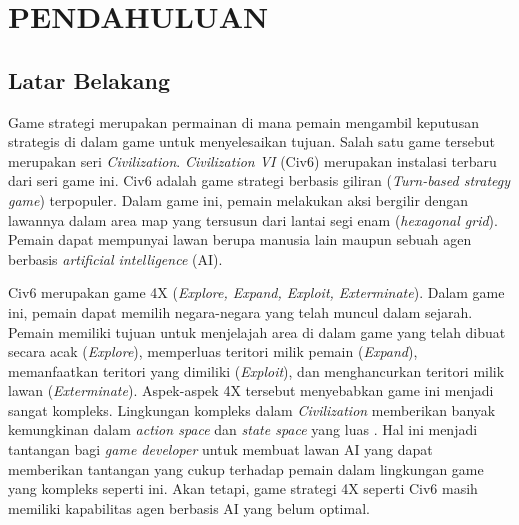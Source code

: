 \chapter{PENDAHULUAN}
\label{chap:pendahuluan}


\section{Latar Belakang}
\label{sec:latarbelakang}

Game strategi merupakan permainan di mana pemain mengambil keputusan strategis di dalam game untuk menyelesaikan tujuan. 
Salah satu game tersebut merupakan seri \emph{Civilization}. 
\emph{Civilization VI} (Civ6) merupakan instalasi terbaru dari seri game ini. 
Civ6 adalah game strategi berbasis giliran (\emph{Turn-based strategy game}) terpopuler. 
Dalam game ini, pemain melakukan aksi bergilir dengan lawannya dalam area map yang tersusun dari lantai segi enam (\emph{hexagonal grid}).
Pemain dapat mempunyai lawan berupa manusia lain maupun sebuah agen berbasis \emph{artificial intelligence} (AI).

Civ6 merupakan game 4X (\emph{Explore, Expand, Exploit, Exterminate}). 
Dalam game ini, pemain dapat memilih negara-negara yang telah muncul dalam sejarah. 
Pemain memiliki tujuan untuk menjelajah area di dalam game yang telah dibuat secara acak (\emph{Explore}), memperluas teritori milik pemain (\emph{Expand}), memanfaatkan teritori yang dimiliki (\emph{Exploit}), dan menghancurkan teritori milik lawan (\emph{Exterminate}). 
Aspek-aspek 4X tersebut menyebabkan game ini menjadi sangat kompleks. 
Lingkungan kompleks dalam \emph{Civilization} memberikan banyak kemungkinan dalam \emph{action space} dan \emph{state space} yang luas \citep{civ4City}.
Hal ini menjadi tantangan bagi \emph{game developer} untuk membuat lawan AI yang dapat memberikan tantangan yang cukup terhadap pemain dalam lingkungan game yang kompleks seperti ini. 
Akan tetapi, game strategi 4X seperti Civ6 masih memiliki kapabilitas agen berbasis AI yang belum optimal.

